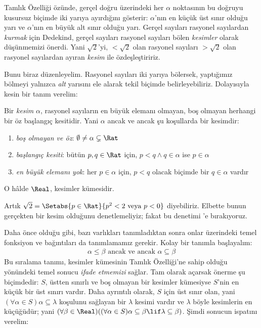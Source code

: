 


Tamlık Özelliği özünde, gerçel doğru üzerindeki her $\alpha$ noktasının bu
doğruyu kusursuz biçimde iki yarıya ayırdığını gösterir: $\alpha$'nın en küçük
üst sınır olduğu yarı ve $\alpha$'nın en büyük alt sınır olduğu yarı. Gerçel
sayıları rasyonel sayılardan \emph{kurmak} için Dedekind, gerçel sayıları
rasyonel sayıları bölen \emph{kesimler} olarak düşünmemizi önerdi. Yani
$\sqrt{2}$'yi, $< \sqrt{2}$ olan rasyonel sayıları $> \sqrt{2}$ olan
rasyonel sayılardan ayıran \emph{kesim} ile özdeşleştiririz.

Bunu biraz düzenleyelim. Rasyonel sayıları iki yarıya bölersek, yaptığımız
bölmeyi yalnızca \emph{alt} yarısını ele alarak tekil biçimde belirleyebiliriz.
Dolayısıyla kesin bir tanım verelim:

\begin{defn}[Kesim]
Bir \emph{kesim} $\alpha$, rasyonel sayıların en büyük elemanı olmayan, boş
olmayan herhangi bir öz başlangıç kesitidir. Yani $\alpha$ ancak ve ancak şu
koşullarda bir kesimdir:
\begin{enumerate}
	\item \emph{boş olmayan ve öz}: $\emptyset \neq \alpha \subsetneq \Rat$
	\item \emph{başlangıç kesiti}: bütün $p,q \in \Rat$ için,
	$p < q \land q \in \alpha$ ise $p \in \alpha$
	\item \emph{en büyük elemanı yok}: her $p \in \alpha$ için,
	$p < q$ olacak biçimde bir $q \in \alpha$ vardır
\end{enumerate}
O hâlde $\Real$, kesimler kümesidir.
\end{defn}

Artık $\sqrt{2} = \Setabs{p \in \Rat}{p^2 < 2\text{ veya }p < 0}$
diyebiliriz. Elbette bunun gerçekten bir kesim olduğunu denetlemeliyiz; fakat
bu denetimi 'e bırakıyoruz.

Daha önce olduğu gibi, bazı varlıkları tanımladıktan sonra onlar üzerindeki
temel fonksiyon ve bağıntıları da tanımlamamız gerekir. Kolay bir tanımla
başlayalım:
\begin{align*}
	\alpha \leq \beta \text{ ancak ve ancak }\alpha \subseteq \beta
\end{align*}
Bu sıralama tanımı, kesimler kümesinin Tamlık Özelliği'ne sahip olduğu
yönündeki temel sonucu \emph{ifade etmemizi} sağlar. Tam olarak açarsak önerme
şu biçimdedir: $S$, üstten sınırlı ve boş olmayan bir kesimler kümesiyse
$S$'nin en küçük bir üst sınırı vardır. Daha ayrıntılı olarak, $S$ için üst
sınır olan, yani $(\forall \alpha \in S)\alpha \subseteq \lambda$ koşulunu
sağlayan bir $\lambda$ kesimi vardır ve $\lambda$ böyle kesimlerin en
küçüğüdür; yani
$(\forall \beta \in \Real)((\forall \alpha \in S)\alpha \subseteq \beta
\lif \lambda \subseteq \beta)$. Şimdi sonucun ispatını verelim:

